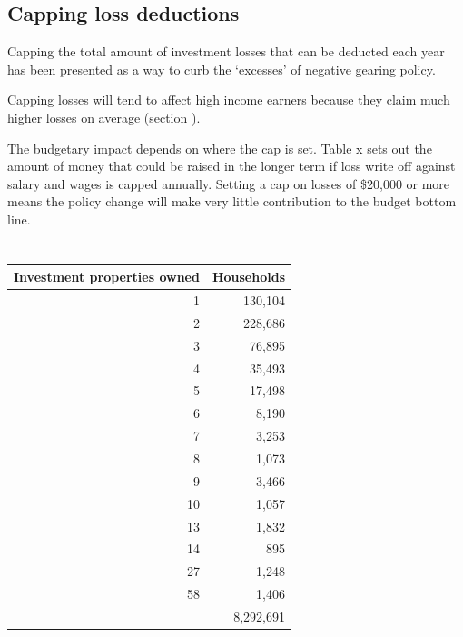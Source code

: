 \documentclass{grattan}\usepackage[]{graphicx}\usepackage[]{color}
\begin{document}
\subsection{Capping loss deductions}

Capping the total amount of investment losses that can be deducted each
year has been presented as a way to curb the `excesses' of negative
gearing policy.

Capping losses will tend to affect high income earners because they
claim much higher losses on average (section ).

The budgetary impact depends on where the cap is set. Table x sets out
the amount of money that could be raised in the longer term if loss
write off against salary and wages is capped annually. Setting a cap on
losses of \$20,000 or more means the policy change will make very little
contribution to the budget bottom line.






\section{}

\begin{table}[!h]
\begin{center}
\begin{tabularx}{\linewidth}{rr}
  \toprule
{\textbf{Investment properties owned}} & {\textbf{Households}} \\ 
  \midrule
  1 & 130,104 \\ 
    2 & 228,686 \\ 
    3 & 76,895 \\ 
    4 & 35,493 \\ 
    5 & 17,498 \\ 
    6 & 8,190 \\ 
    7 & 3,253 \\ 
    8 & 1,073 \\ 
    9 & 3,466 \\ 
   10 & 1,057 \\ 
   13 & 1,832 \\ 
   14 & 895 \\ 
   27 & 1,248 \\ 
   58 & 1,406 \\ 
   & 8,292,691 \\ 
   \bottomrule
\end{tabularx}

\end{center}
\end{table}
\end{document}
